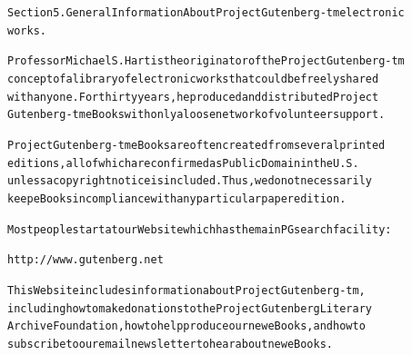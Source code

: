 \documentclass[12pt]{book}[2005/09/16]
\newenvironment{PGtext}{%
\begin{alltt}
\fontsize{8.1}{10}\ttfamily\selectfont}%
{\end{alltt}}
\renewcommand{\(}{{\upshape(}}
\renewcommand{\)}{{\upshape)}}
\begin{document}
\begin{PGtext}
Section 5.  General Information About Project Gutenberg-tm electronic
works.

Professor Michael S. Hart is the originator of the Project Gutenberg-tm
concept of a library of electronic works that could be freely shared
with anyone.  For thirty years, he produced and distributed Project
Gutenberg-tm eBooks with only a loose network of volunteer support.


Project Gutenberg-tm eBooks are often created from several printed
editions, all of which are confirmed as Public Domain in the U.S.
unless a copyright notice is included.  Thus, we do not necessarily
keep eBooks in compliance with any particular paper edition.


Most people start at our Web site which has the main PG search facility:

     http://www.gutenberg.net

This Web site includes information about Project Gutenberg-tm,
including how to make donations to the Project Gutenberg Literary
Archive Foundation, how to help produce our new eBooks, and how to
subscribe to our email newsletter to hear about new eBooks.
\end{PGtext}

\end{document}
